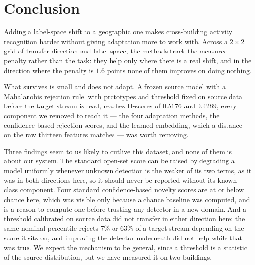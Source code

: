\begin{abstract}
That last observation is the main result. A threshold set to reject $1\%$ of source
validation rejects between $7\%$ and $63\%$ of the target stream, depending only on which
score carries it. Improving detection does not fix it: a source-only weighting rule that
gains $0.064$ AUROC in the direction with headroom \emph{loses} $0.11$ H at the threshold a
deployment would use, while the variant with the best H in both directions has
significantly worse AUROC in one. Detection quality and deployed open-set performance come
apart, so cross-domain threshold calibration is the binding constraint rather than one
difficulty among several. We recommend reporting the rejection rate, which is observable
without labels, beside every open-set score.
\end{abstract}

\section{Conclusion}
\label{sec:os-conclusion}

Adding a label-space shift to a geographic one makes cross-building activity recognition
harder without giving adaptation more to work with. Across a $2\times2$ grid of transfer
direction and label space, the methods track the measured penalty rather than the task:
they help only where there is a real shift, and in the direction where the penalty is
$1.6$ points none of them improves on doing nothing.

What survives is small and does not adapt. A frozen source model with a Mahalanobis
rejection rule, with prototypes and threshold fixed on source data before the target
stream is read, reaches H-scores of $0.5176$ and $0.4289$; every component we removed to
reach it --- the four adaptation methods, the confidence-based rejection scores, and the
learned embedding, which a distance on the raw thirteen features matches --- was worth
removing.

Three findings seem to us likely to outlive this dataset, and none of them is about our
system. The standard open-set score can be raised by degrading a model
uniformly whenever unknown detection is the weaker of its two terms, as it was in both
directions here, so it should never be reported without its known-class component. Four standard confidence-based
novelty scores are at or below chance here, which was visible only because a chance
baseline was computed, and is a reason to compute one before trusting any detector in a
new domain. And a threshold calibrated on source data did not transfer in either
direction here: the same nominal percentile rejects $7\%$ or $63\%$ of a target stream
depending on the score it sits on, and improving the detector underneath did not help
while that was true. We expect the mechanism to be general, since a threshold is a
statistic of the source distribution, but we have measured it on two buildings.

